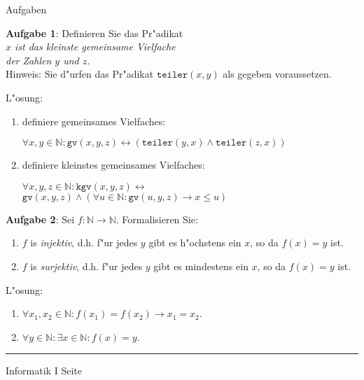 \begin{slide}{}
\normalsize
\begin{center}
Aufgaben
\end{center}
\vspace{0.5cm}

\footnotesize
\textbf{Aufgabe 1}: Definieren Sie das Pr"adikat\\[0.3cm]
\hspace*{1.3cm} {\em $x$ ist das kleinste gemeinsame Vielfache \\
\hspace*{1.3cm}  der Zahlen $y$ und $z$.} \\[0.3cm]
Hinweis: Sie d"urfen das Pr"adikat $\mathtt{teiler}(x, y)$ als gegeben voraussetzen.

L"osung:
\begin{enumerate}
\item definiere gemeinsames Vielfaches:

      $\forall x,y \in \mathbb{N}: \mathtt{gv}(x, y, z) \leftrightarrow \left( \mathtt{teiler}(y, x) \wedge \mathtt{teiler}(z, x) \right)$
\item definiere kleinstes gemeinsames Vielfaches:

      $\forall x,y,z \in \mathbb{N}: \mathtt{kgv}(x,y,z) \leftrightarrow$ \\[0.1cm]
\hspace*{1.3cm} $\mathtt{gv}(x, y, z) \wedge (\forall u \in \mathbb{N}: \mathtt{gv}(u, y, z) \rightarrow x \leq u)$
\end{enumerate}

\textbf{Aufgabe 2}: Sei $f: \mathbb{N} \rightarrow \mathbb{N}$. Formalisieren Sie:
\begin{enumerate}
\item $f$ is {\em injektiv}, d.h. f"ur jedes $y$ gibt es h"ochstens ein $x$, so da\3
      $f(x) = y$ ist.
\item $f$ is {\em surjektiv}, d.h. f"ur jedes $y$ gibt es mindestens ein $x$, so da\3
      $f(x) = y$ ist.
\end{enumerate}

L"osung:
\begin{enumerate}
\item $\forall x_1, x_2 \in \mathbb{N}: f(x_1) = f(x_2) \rightarrow x_1 = x_2$.
\item $\forall y \in \mathbb{N}: \exists x \in \mathbb{N}: f(x) = y$.
\end{enumerate}

\vspace*{\fill}
\tiny \addtocounter{mypage}{1}
\rule{15cm}{1mm}
Informatik I  \hspace*{\fill} Seite 
\end{slide}

